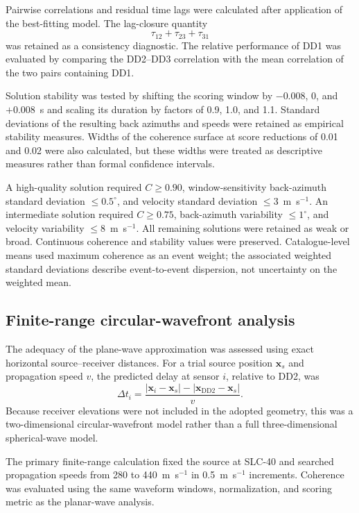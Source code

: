 \documentclass[]{seismica}
\begin{document}
Pairwise correlations and residual time lags were calculated after application of the best-fitting model. The lag-closure quantity
\begin{equation}
  \tau_{12}+\tau_{23}+\tau_{31}
  \label{eq:lag_closure}
\end{equation}
was retained as a consistency diagnostic. The relative performance of DD1 was evaluated by comparing the DD2--DD3 correlation with the mean correlation of the two pairs containing DD1.

Solution stability was tested by shifting the scoring window by $-0.008$, 0, and $+0.008$~s and scaling its duration by factors of 0.9, 1.0, and 1.1. Standard deviations of the resulting back azimuths and speeds were retained as empirical stability measures. Widths of the coherence surface at score reductions of 0.01 and 0.02 were also calculated, but these widths were treated as descriptive measures rather than formal confidence intervals.

A high-quality solution required $C\geq0.90$, window-sensitivity back-azimuth
standard deviation $\leq0.5^\circ$, and velocity standard deviation
$\leq3$~m~s$^{-1}$. An intermediate solution required $C\geq0.75$,
back-azimuth variability $\leq1^\circ$, and velocity variability
$\leq8$~m~s$^{-1}$. All remaining solutions were retained as weak or broad.
Continuous coherence and stability values were preserved. Catalogue-level
means used maximum coherence as an event weight; the associated weighted
standard deviations describe event-to-event dispersion, not uncertainty on the
weighted mean.

\subsection{Finite-range circular-wavefront analysis}

The adequacy of the plane-wave approximation was assessed using exact horizontal source--receiver distances. For a trial source position $\mathbf{x}_s$ and propagation speed $v$, the predicted delay at sensor $i$, relative to DD2, was
\begin{equation}
  \Delta t_i = \frac{|\mathbf{x}_i-\mathbf{x}_s|-|\mathbf{x}_{\mathrm{DD2}}-\mathbf{x}_s|}{v}.
  \label{eq:circular_delay}
\end{equation}
Because receiver elevations were not included in the adopted geometry, this was a two-dimensional circular-wavefront model rather than a full three-dimensional spherical-wave model.

The primary finite-range calculation fixed the source at SLC-40 and searched propagation speeds from 280 to 440~m~s$^{-1}$ in 0.5~m~s$^{-1}$ increments. Coherence was evaluated using the same waveform windows, normalization, and scoring metric as the planar-wave analysis.
\end{document}
